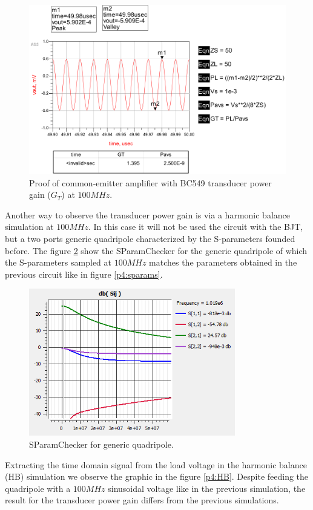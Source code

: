 \begin{figure}[H] 
\centering
\includegraphics[width=13cm]{images/gtproof.png}
\caption{Proof of common-emitter amplifier with BC549 transducer power gain ($G_T$) at $100 MHz$.}
\label{p4:gtproof} 
\end{figure}

Another way to observe the transducer power gain is via a harmonic balance simulation at $100 MHz$. In this case it will not be used the circuit with the BJT, but a two ports generic quadripole characterized by the S-parameters founded before. The figure \ref{p4:Sparamcheck} show the SParamChecker for the generic quadripole of which the S-parameters sampled at $100 MHz$ matches the parameters obtained in the previous circuit like in figure \ref{p4:sparams}.

\begin{figure}[H] 
\centering
\includegraphics[width=9cm]{images/SParamChecker.png}
\caption{SParamChecker for generic quadripole.}
\label{p4:Sparamcheck} 
\end{figure}

Extracting the time domain signal from the load voltage in the harmonic balance (HB) simulation we observe the graphic in the figure \ref{p4:HB}. Despite feeding the quadripole with a $100 MHz$ sinusoidal voltage like in the previous simulation, the result for the transducer power gain differs from the previous simulations. 

